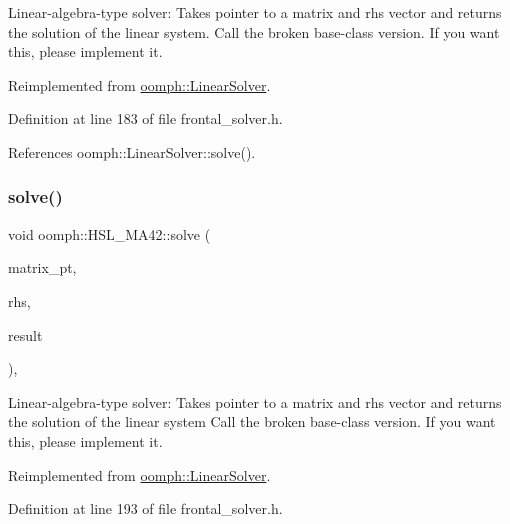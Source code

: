 Linear-\/algebra-\/type solver\+: Takes pointer to a matrix and rhs vector and returns the solution of the linear system. Call the broken base-\/class version. If you want this, please implement it. 



Reimplemented from \hyperlink{classoomph_1_1LinearSolver_a546c09822d18191df14caed864c04c09}{oomph\+::\+Linear\+Solver}.



Definition at line 183 of file frontal\+\_\+solver.\+h.



References oomph\+::\+Linear\+Solver\+::solve().

\mbox{\label{classoomph_1_1HSL__MA42_ad8f7434a5b1391751ac513c7dc1acc77}} 
\subsubsection{\texorpdfstring{solve()}{solve()}\hspace{0.1cm}{\footnotesize\ttfamily [3/3]}}
{\footnotesize\ttfamily void oomph\+::\+H\+S\+L\+\_\+\+M\+A42\+::solve (\begin{DoxyParamCaption}\item[{\hyperlink{classoomph_1_1DoubleMatrixBase}{Double\+Matrix\+Base} $\ast$const \&}]{matrix\+\_\+pt,  }\item[{const \hyperlink{classoomph_1_1Vector}{Vector}$<$ double $>$ \&}]{rhs,  }\item[{\hyperlink{classoomph_1_1Vector}{Vector}$<$ double $>$ \&}]{result }\end{DoxyParamCaption})\hspace{0.3cm}{\ttfamily [inline]}, {\ttfamily [virtual]}}



Linear-\/algebra-\/type solver\+: Takes pointer to a matrix and rhs vector and returns the solution of the linear system Call the broken base-\/class version. If you want this, please implement it. 



Reimplemented from \hyperlink{classoomph_1_1LinearSolver_a1f7a2ee2cd18d3dafc20a61ca2f52dbb}{oomph\+::\+Linear\+Solver}.



Definition at line 193 of file frontal\+\_\+solver.\+h.




